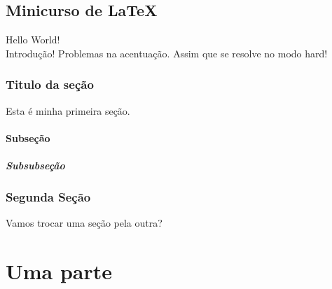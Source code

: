 \documentclass[10pt,a4paper]{book}
\begin{document}
 
	
	\chapter{Minicurso de \LaTeX}
	
	Hello World! \\ 
	Introdução!
	Problemas na acentua\c{c}\~ao. Assim que se resolve no modo hard!
	
	\section{Titulo da seção}
		Esta é minha primeira seção.
		\subsection{Subseção}
			\subsubsection{Subsubseção}
 	\section{Segunda Seção}
		Vamos trocar uma seção pela outra?
	
	\part{Uma parte}
\end{document}
